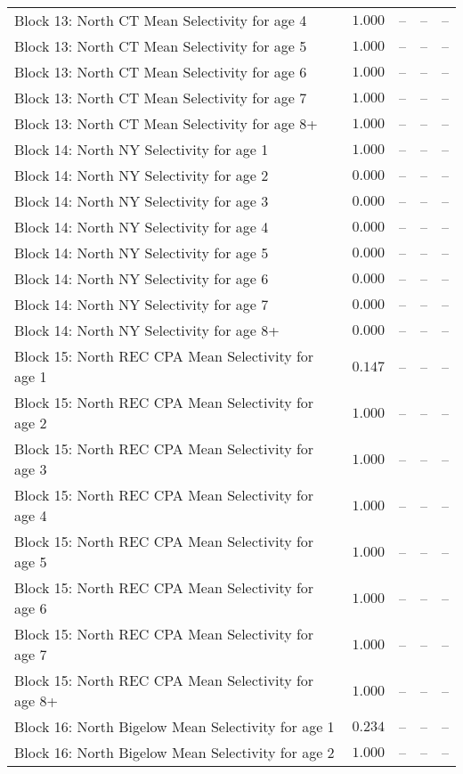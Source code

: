 \documentclass[
]{article}
\begin{document}
\begin{landscape}
\begin{longtable}[t]{lrrrr}
\addlinespace
Block 13: North CT Mean Selectivity for age 4 & $1.000$ & -- & -- & --\\
Block 13: North CT Mean Selectivity for age 5 & $1.000$ & -- & -- & --\\
Block 13: North CT Mean Selectivity for age 6 & $1.000$ & -- & -- & --\\
Block 13: North CT Mean Selectivity for age 7 & $1.000$ & -- & -- & --\\
Block 13: North CT Mean Selectivity for age 8+ & $1.000$ & -- & -- & --\\
\addlinespace
Block 14: North NY Selectivity for age 1 & $1.000$ & -- & -- & --\\
Block 14: North NY Selectivity for age 2 & $0.000$ & -- & -- & --\\
Block 14: North NY Selectivity for age 3 & $0.000$ & -- & -- & --\\
Block 14: North NY Selectivity for age 4 & $0.000$ & -- & -- & --\\
Block 14: North NY Selectivity for age 5 & $0.000$ & -- & -- & --\\
\addlinespace
Block 14: North NY Selectivity for age 6 & $0.000$ & -- & -- & --\\
Block 14: North NY Selectivity for age 7 & $0.000$ & -- & -- & --\\
Block 14: North NY Selectivity for age 8+ & $0.000$ & -- & -- & --\\
Block 15: North REC CPA Mean Selectivity for age 1 & $0.147$ & -- & -- & --\\
Block 15: North REC CPA Mean Selectivity for age 2 & $1.000$ & -- & -- & --\\
\addlinespace
Block 15: North REC CPA Mean Selectivity for age 3 & $1.000$ & -- & -- & --\\
Block 15: North REC CPA Mean Selectivity for age 4 & $1.000$ & -- & -- & --\\
Block 15: North REC CPA Mean Selectivity for age 5 & $1.000$ & -- & -- & --\\
Block 15: North REC CPA Mean Selectivity for age 6 & $1.000$ & -- & -- & --\\
Block 15: North REC CPA Mean Selectivity for age 7 & $1.000$ & -- & -- & --\\
\addlinespace
Block 15: North REC CPA Mean Selectivity for age 8+ & $1.000$ & -- & -- & --\\
Block 16: North Bigelow Mean Selectivity for age 1 & $0.234$ & -- & -- & --\\
Block 16: North Bigelow Mean Selectivity for age 2 & $1.000$ & -- & -- & --\\

\end{longtable}
\end{landscape}
\end{document}
